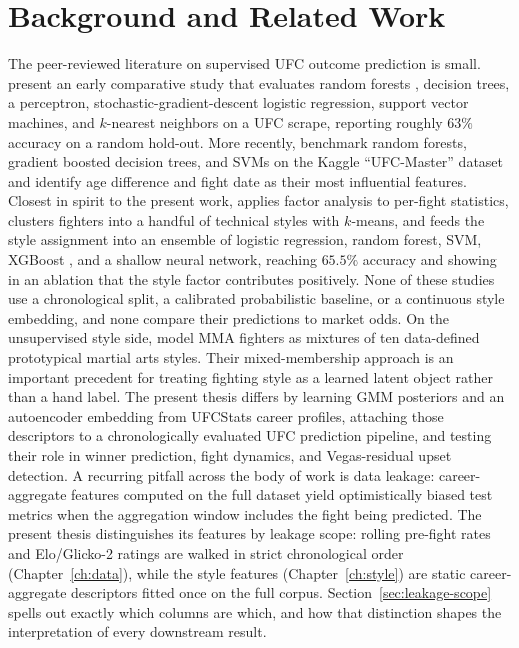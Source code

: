 \documentclass[12pt,oneside]{report}
\begin{document}
\chapter{Background and Related Work}\label{ch:background}

The peer-reviewed literature on supervised UFC outcome prediction
is small.  \citet{hitkul2019mma} present an early comparative study
that evaluates random forests \citep{breiman2001random}, decision
trees, a perceptron, stochastic-gradient-descent logistic regression,
support vector machines, and $k$-nearest neighbors on a UFC scrape,
reporting roughly $63\%$ accuracy on a random hold-out.  More
recently, \citet{sheng2024ufc} benchmark random forests, gradient
boosted decision trees, and SVMs on the Kaggle ``UFC-Master'' dataset
and identify age difference and fight date as their most influential
features.  Closest in spirit to the present work,
\citet{yin2024mma} applies factor analysis to per-fight statistics,
clusters fighters into a handful of technical styles with $k$-means,
and feeds the style assignment into an ensemble of logistic regression,
random forest, SVM, XGBoost \citep{chen2016xgboost}, and a shallow
neural network, reaching $65.5\%$ accuracy and showing in an ablation
that the style factor contributes positively.  None of these studies
use a chronological split, a calibrated probabilistic baseline, or a
continuous style embedding, and none compare their predictions to
market odds.  On the unsupervised style side,
\citet{hackett2017mma} model MMA fighters as mixtures of ten
data-defined prototypical martial arts styles.  Their mixed-membership
approach is an important precedent for treating fighting style as a
learned latent object rather than a hand label.  The present thesis
differs by learning GMM posteriors and an autoencoder embedding from
UFCStats career profiles, attaching those descriptors to a
chronologically evaluated UFC prediction pipeline, and testing their
role in winner prediction, fight dynamics, and Vegas-residual upset
detection.  A recurring pitfall across the body of work is
data leakage: career-aggregate features computed on the full
dataset yield optimistically biased test metrics when the aggregation
window includes the fight being predicted.  The present thesis
distinguishes its features by leakage scope: rolling pre-fight
rates and Elo/Glicko-2 ratings are walked in strict chronological
order (Chapter~\ref{ch:data}), while the style features
(Chapter~\ref{ch:style}) are static career-aggregate descriptors
fitted once on the full corpus.  Section~\ref{sec:leakage-scope}
spells out exactly which columns are which, and how that distinction
shapes the interpretation of every downstream result.
\end{document}
